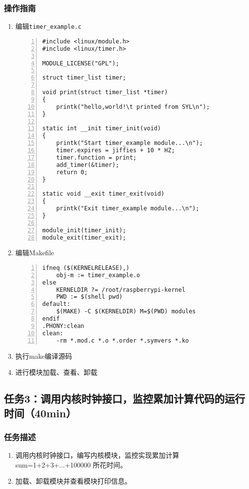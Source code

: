 \documentclass{article}
\begin{document}
\subsubsection{操作指南}
\begin{enumerate}
	\item 编辑\verb|timer_example.c|
	      \begin{lstlisting}[numbers=left]
#include <linux/module.h>
#include <linux/timer.h>

MODULE_LICENSE("GPL");

struct timer_list timer;

void print(struct timer_list *timer)
{
	printk("hello,world!\t printed from SYL\n");
}

static int __init timer_init(void)
{
	printk("Start timer_example module...\n");
	timer.expires = jiffies + 10 * HZ;
	timer.function = print;
	add_timer(&timer);
	return 0;
}

static void __exit timer_exit(void)
{
	printk("Exit timer_example module...\n");
}

module_init(timer_init);
module_exit(timer_exit);

\end{lstlisting}
	\item 编辑Makefile
	      \begin{lstlisting}[numbers=left]
ifneq ($(KERNELRELEASE),)
	obj-m := timer_example.o
else
	KERNELDIR ?= /root/raspberrypi-kernel
	PWD := $(shell pwd)
default:
	$(MAKE) -C $(KERNELDIR) M=$(PWD) modules
endif
.PHONY:clean
clean:
	-rm *.mod.c *.o *.order *.symvers *.ko

\end{lstlisting}
	\item 执行make编译源码
	\item 进行模块加载、查看、卸载
\end{enumerate}

\newpage




\subsection{任务3：调用内核时钟接口，监控累加计算代码的运行时间（40min）}

\subsubsection{任务描述}
\begin{enumerate}
	\item 调用内核时钟接口，编写内核模块，监控实现累加计算sum=1+2+3+...+100000 所花时间。
	\item 加载、卸载模块并查看模块打印信息。
\end{enumerate}
\end{document}
